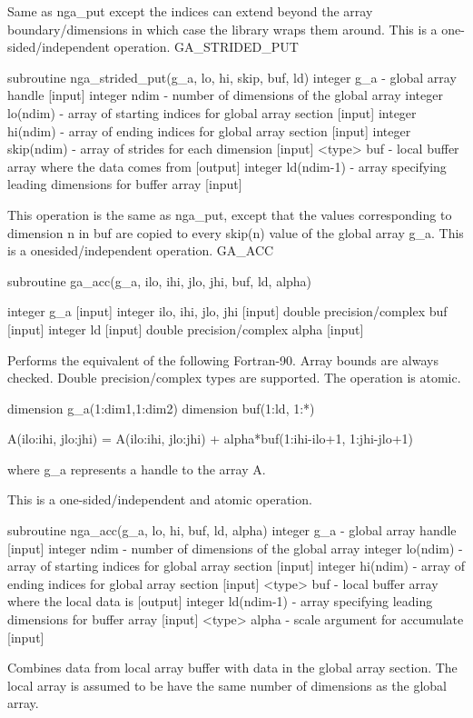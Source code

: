Same as nga\_put except the indices can extend beyond the array boundary/dimensions
in which case the library wraps them around. This is a one-sided/independent
operation. GA\_STRIDED\_PUT

subroutine nga\_strided\_put(g\_a, lo, hi, skip, buf, ld) integer
g\_a - global array handle {[}input{]} integer ndim - number of dimensions
of the global array integer lo(ndim) - array of starting indices for
global array section {[}input{]} integer hi(ndim) - array of ending
indices for global array section {[}input{]} integer skip(ndim) -
array of strides for each dimension {[}input{]} <type> buf - local
buffer array where the data comes from {[}output{]} integer ld(ndim-1)
- array specifying leading dimensions for buffer array {[}input{]}

This operation is the same as nga\_put, except that the values corresponding
to dimension n in buf are copied to every skip(n) value of the global
array g\_a. This is a onesided/independent operation. GA\_ACC

subroutine ga\_acc(g\_a, ilo, ihi, jlo, jhi, buf, ld, alpha)

integer g\_a {[}input{]} integer ilo, ihi, jlo, jhi {[}input{]} double
precision/complex buf {[}input{]} integer ld {[}input{]} double precision/complex
alpha {[}input{]}

Performs the equivalent of the following Fortran-90. Array bounds
are always checked. Double precision/complex types are supported.
The operation is atomic.

dimension g\_a(1:dim1,1:dim2) dimension buf(1:ld, 1:{*})

A(ilo:ihi, jlo:jhi) = A(ilo:ihi, jlo:jhi) + alpha{*}buf(1:ihi-ilo+1,
1:jhi-jlo+1)

where g\_a represents a handle to the array A.

This is a one-sided/independent and atomic operation.

subroutine nga\_acc(g\_a, lo, hi, buf, ld, alpha) integer g\_a - global
array handle {[}input{]} integer ndim - number of dimensions of the
global array integer lo(ndim) - array of starting indices for global
array section {[}input{]} integer hi(ndim) - array of ending indices
for global array section {[}input{]} <type> buf - local buffer array
where the local data is {[}output{]} integer ld(ndim-1) - array specifying
leading dimensions for buffer array {[}input{]} <type> alpha - scale
argument for accumulate {[}input{]}

Combines data from local array buffer with data in the global array
section. The local array is assumed to be have the same number of
dimensions as the global array.

